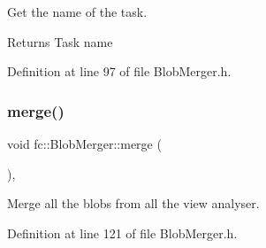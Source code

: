 Get the name of the task. 

\begin{DoxyReturn}{Returns}
Task name 
\end{DoxyReturn}


Definition at line 97 of file Blob\+Merger.\+h.

\mbox{\label{classfc_1_1BlobMerger_a11fa980b355aa46271460f33a5cce0ac}} 
\subsubsection{\texorpdfstring{merge()}{merge()}}
{\footnotesize\ttfamily void fc\+::\+Blob\+Merger\+::merge (\begin{DoxyParamCaption}{ }\end{DoxyParamCaption})\hspace{0.3cm}{\ttfamily [inline]}, {\ttfamily [private]}}



Merge all the blobs from all the view analyser. 



Definition at line 121 of file Blob\+Merger.\+h.


